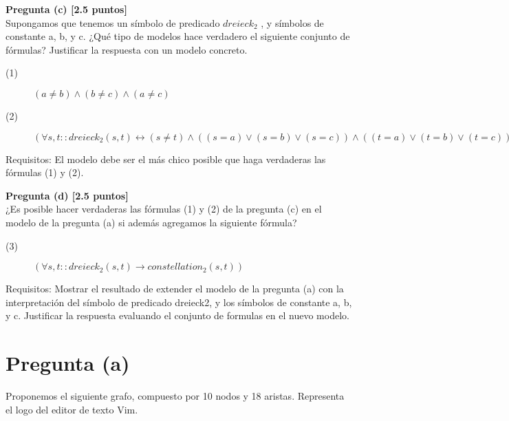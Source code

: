 \documentclass[a4paper,11pt]{article}
\begin{document}
\textbf{Pregunta (c) [2.5 puntos]} \\
Supongamos que tenemos un símbolo de predicado $dreieck_2$ , y símbolos de constante a, b, y c. ¿Qué
tipo de modelos hace verdadero el siguiente conjunto de fórmulas? Justificar la respuesta con un modelo
concreto.

\begin{description}
    \item[(1)] $(a \neq b) \land (b \neq c) \land (a \neq c)$
    \item[(2)] $(\forall s, t :: dreieck_2(s, t) \leftrightarrow (s \neq t) \land ((s = a) \lor (s = b) \lor (s = c)) \land ((t = a) \lor (t = b) \lor (t = c)))$
\end{description}
Requisitos: El modelo debe ser el más chico posible que haga verdaderas las fórmulas (1) y (2).

\textbf{Pregunta (d) [2.5 puntos]} \\
¿Es posible hacer verdaderas las fórmulas (1) y (2) de la pregunta (c) en el modelo de la pregunta (a) si
además agregamos la siguiente fórmula?

\begin{description}
    \item[(3)] $(\forall s, t :: dreieck_2(s, t) \rightarrow constellation_2(s, t))$
\end{description}

Requisitos: Mostrar el resultado de extender el modelo de la pregunta (a) con la interpretación del
símbolo de predicado dreieck2, y los símbolos de constante a, b, y c. Justificar la respuesta evaluando el
conjunto de formulas en el nuevo modelo.

\newpage

\section{Pregunta (a)}

Proponemos el siguiente grafo, compuesto por 10 nodos y 18 aristas. Representa el logo del editor de texto Vim.

\begin{center}
\end{center}
\end{document}
